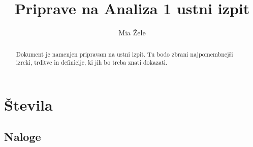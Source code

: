 \documentclass[a4paper,12pt]{report}
\begin{document}
\title{Priprave na Analiza 1 ustni izpit}
\author{Mia Žele}
\date{}

\maketitle

\tableofcontents

\begin{abstract}
    Dokument je namenjen pripravam na ustni izpit. Tu bodo zbrani najpomembnejši
    izreki, trditve in definicije, ki jih bo treba znati dokazati.
\end{abstract}


\chapter{Števila}

\section*{Naloge}
\end{document}
